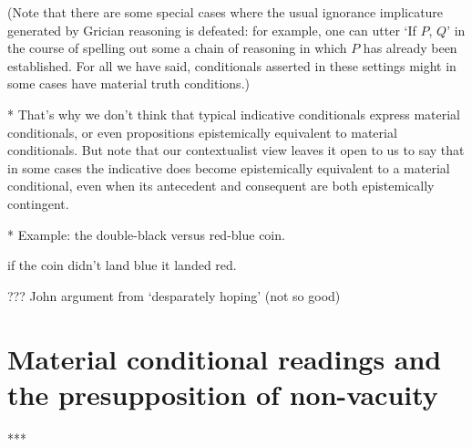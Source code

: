 \documentclass[If.tex]{subfiles}
\begin{document}
(Note that there are some special cases where the usual ignorance implicature generated by Grician reasoning is defeated: for example, one can utter ‘If $P$, $Q$’ in the course of spelling out some a chain of reasoning in which $P$ has already been established.  For all we have said, conditionals asserted in these settings might in some cases have material truth conditions.)



* That's why we don't think that typical indicative conditionals express material conditionals, or even propositions epistemically equivalent to material conditionals.  But note that our contextualist view leaves it open to us to say that in some cases the indicative does become epistemically equivalent to a material conditional, even when its antecedent and consequent are both epistemically contingent.  

* Example: the double-black versus red-blue coin.  
\begin{prop}
	 if the coin didn't land blue it landed red.
\end{prop}
??? John argument from ‘desparately hoping’ (not so good)



\section{Material conditional readings and the presupposition of non-vacuity}
\label{sect:material}
***
\end{document}
